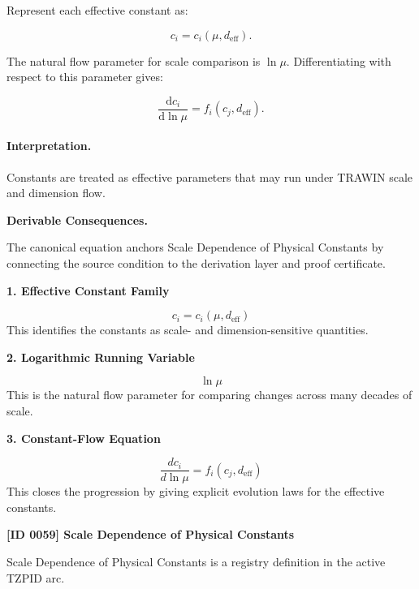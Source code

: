 Represent each effective constant as:

\begin{equation}
c_i=c_i(\mu,d_{\mathrm{eff}}).
\end{equation}

The natural flow parameter for scale comparison is $\ln\mu$.  
Differentiating with respect to this parameter gives:

\begin{equation}
\boxed{
\frac{\mathrm{d}c_i}{\mathrm{d}\ln\mu}
=
f_i(c_j,d_{\mathrm{eff}}).
}
\end{equation}

\paragraph{Interpretation.}
Constants are treated as effective parameters that may run under TRAWIN scale and dimension flow.

\par\vspace{0.35em}
\noindent\textbf{Derivable Consequences.}\quad
\begingroup
\footnotesize
\raggedright
The canonical equation anchors Scale Dependence of Physical Constants by connecting the source condition to the derivation layer and proof certificate.
\par\endgroup

\noindent\textbf{1. Effective Constant Family}\par
\[
c_{i} = c_{i}(\mu,d_{\mathrm{eff}})
\]
\noindent This identifies the constants as scale- and dimension-sensitive quantities.\par
\noindent\textbf{2. Logarithmic Running Variable}\par
\[
\ln\mu
\]
\noindent This is the natural flow parameter for comparing changes across many decades of scale.\par
\noindent\textbf{3. Constant-Flow Equation}\par
\[
\frac{dc_{i}}{d\ln\mu}
=
f_{i}\!\left(c_{j},d_{\mathrm{eff}}\right)
\]
\noindent This closes the progression by giving explicit evolution laws for the effective constants.\par

\clearpage
\noindent\textbf{[ID 0059] Scale Dependence of Physical Constants}\par
\vspace{0.35em}
\begingroup\small
{}
Scale Dependence of Physical Constants is a registry definition in the active TZPID arc.

